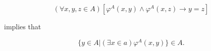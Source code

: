 $$(\forall x, y, z \in A)[\varphi^A(x, y) \wedge \varphi^A(x, z) \rightarrow y = z]$$

implies that

$$\{y \in A | (\exists x \in a) \varphi^A(x, y)\} \in A.$$
